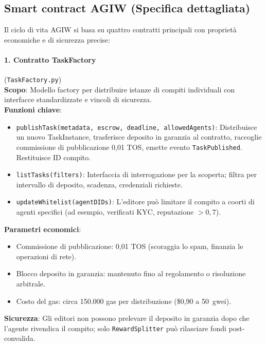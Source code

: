 \documentclass[11pt]{article}
\begin{document}
\subsection{Smart contract AGIW (Specifica dettagliata)}
\label{sec:agiw-contracts}
Il ciclo di vita AGIW si basa su quattro contratti principali con proprietà economiche e di sicurezza precise:

\paragraph{1. Contratto TaskFactory} (\texttt{TaskFactory.py})\\
\textbf{Scopo}: Modello factory per distribuire istanze di compiti individuali con interfacce standardizzate e vincoli di sicurezza.\\
\textbf{Funzioni chiave}:
\begin{itemize}[noitemsep]
  \item \texttt{publishTask(metadata, escrow, deadline, allowedAgents)}: Distribuisce un nuovo TaskInstance, trasferisce deposito in garanzia al contratto, raccoglie commissione di pubblicazione 0,01 TOS, emette evento \texttt{TaskPublished}. Restituisce ID compito.
  \item \texttt{listTasks(filters)}: Interfaccia di interrogazione per la scoperta; filtra per intervallo di deposito, scadenza, credenziali richieste.
  \item \texttt{updateWhitelist(agentDIDs)}: L'editore può limitare il compito a coorti di agenti specifici (ad esempio, verificati KYC, reputazione $>0,7$).
\end{itemize}
\textbf{Parametri economici}:
\begin{itemize}[noitemsep]
  \item Commissione di pubblicazione: 0,01 TOS (scoraggia lo spam, finanzia le operazioni di rete).
  \item Blocco deposito in garanzia: mantenuto fino al regolamento o risoluzione arbitrale.
  \item Costo del gas: circa 150.000 gas per distribuzione (\$0,90 a 50~gwei).
\end{itemize}
\textbf{Sicurezza}: Gli editori non possono prelevare il deposito in garanzia dopo che l'agente rivendica il compito; solo \texttt{RewardSplitter} può rilasciare fondi post-convalida.
\end{document}
